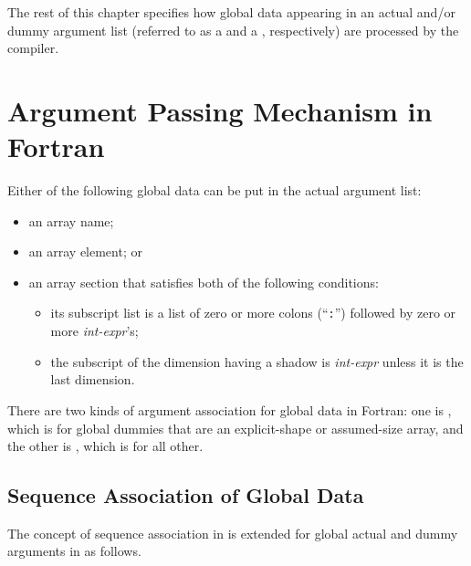 \vspace{1.5zw}

\hspace{-1.2\parindent}
The rest of this chapter specifies how global data appearing in an
actual and/or dummy argument list (referred to as a {\it {}} and a {\it {}}, respectively) are
processed by the {\XMP} compiler.


\section{Argument Passing Mechanism in {\XMP} Fortran}


Either of the following global data can be put in the actual argument list:

\begin{itemize}
 \item an array name;
 \item an array element; or
 \item an array section that satisfies both of the following
       conditions:
       \begin{itemize}
	\item its subscript list is a list of zero or more colons
	      (``{\tt :}'') followed by zero or more {\it int-expr}'s;
	\item the subscript of the dimension having a shadow is {\it
	      int-expr} unless it is the last dimension.
       \end{itemize}
\end{itemize}

There are two kinds of argument association for global data in {\XMP}
Fortran: one is {\it {}}, which is for global
dummies that are an explicit-shape or assumed-size array, and the other is
{\it {}}, which is for all other.


\subsection{Sequence Association of Global Data}

The concept of sequence association in {\Fort} is extended for global
actual and dummy arguments in {\XMP} as follows.

